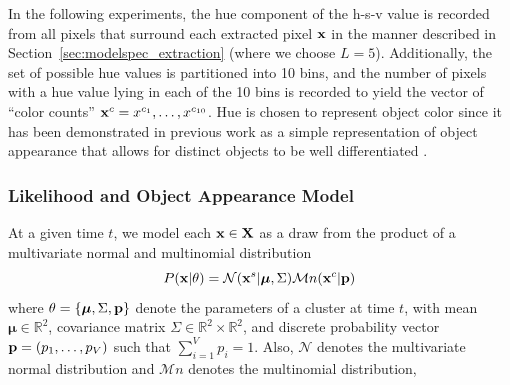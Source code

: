\documentclass[smallcondensed, final]{svjour3}
\begin{document}
In the following experiments, the hue component of the h-s-v value is recorded from all pixels that surround each extracted pixel $\bold{x}$ in the manner described in Section~\ref{sec:modelspec_extraction} (where we choose $L=5$). Additionally, the set of possible hue values is partitioned into 10 bins, and the number of pixels with a hue value lying in each of the 10 bins is recorded to yield the vector of ``color counts'' $\bold{x}^{c} = x^{c_{1}}, \ldots, x^{c_{10}}$. Hue is chosen to represent object color since it has been demonstrated in previous work as a simple representation of object appearance that allows for distinct objects to be well differentiated \cite{perez_2002, raja_1998, mckenna_1999}.






\subsubsection{Likelihood and Object Appearance Model}

At a given time $t$, we model each $\bold{x} \in \bold{X}$ as a draw from the product of a multivariate normal and multinomial distribution
\begin{equation}
\label{likelihood}
P(\bold{x}|\theta) = \mathcal{N}(\bold{x}^{s} | \boldsymbol{\mu}, \Sigma)  \mathcal{M}n(\bold{x}^{c} | \bold{p})
\end{equation}
where $\theta = \{ \boldsymbol{\mu}, \Sigma, \bold{p} \}$ denote the parameters of a cluster at time $t$, with mean $\boldsymbol{\mu} \in \mathbb{R}^{2}$, covariance matrix $\Sigma \in \mathbb{R}^{2} \times \mathbb{R}^{2}$, and discrete probability vector $\bold{p} = (p_{1}, \ldots, p_{V})$ such that $\sum_{i=1}^{V}p_{i} = 1$. Also, $\mathcal{N}$ denotes the multivariate normal distribution and $\mathcal{M}n$ denotes the multinomial distribution, 
\end{document}
